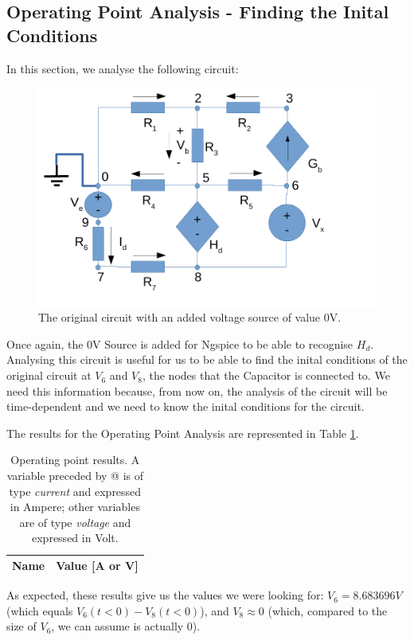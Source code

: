 \subsection{Operating Point Analysis - Finding the Inital Conditions}

In this section, we analyse the following circuit:

 

\begin{figure}[h] \centering
\includegraphics[width=0.5\linewidth]{t2-sim2.pdf}
\caption{The original circuit with an added voltage source of value 0V.}
\label{fig:sim2}
\end{figure}

Once again, the 0V Source is added for Ngspice to be able to recognise $H_d$.
Analysing this circuit is useful for us to be able to find the inital conditions of the original circuit at $V_6$ and $V_8$, the nodes that the Capacitor is connected to. We need this information because, from now on, the analysis of the circuit will be time-dependent and we need to know the inital conditions for the circuit.

The results for the Operating Point Analysis are represented in Table \ref{tab:sim2}.

 

\begin{table}[htb!]
  \centering
  \begin{tabular}{|l|r|}
    \hline    
    {\bf Name} & {\bf Value [A or V]} \\ \hline
    
  \end{tabular}
  \caption{Operating point results. A variable preceded by @ is of type {\em current}
    and expressed in Ampere; other variables are of type {\it voltage} and expressed in
    Volt.}
  \label{tab:sim2}
\end{table}

As expected, these results give us the values we were looking for: $V_6 = 8.683696V$ (which equals $V_6(t < 0) - V_8(t < 0)$), and $V_8 \approx 0$ (which, compared to the size of $V_6$, we can assume is actually 0).


